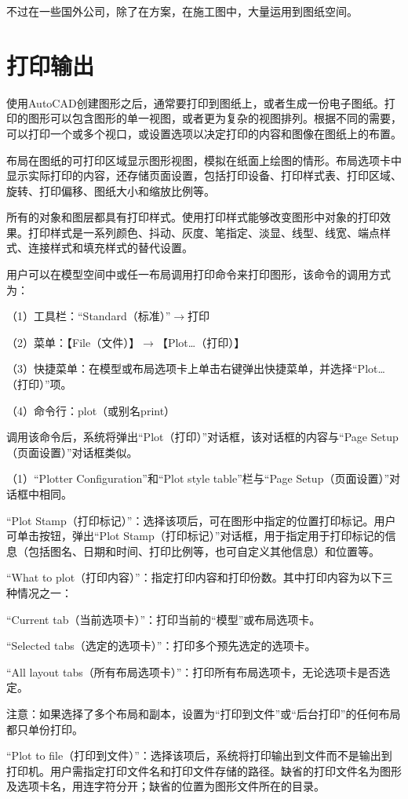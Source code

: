 不过在一些国外公司，除了在方案，在施工图中，大量运用到图纸空间。


\chapter{打印输出}


使用AutoCAD创建图形之后，通常要打印到图纸上，或者生成一份电子图纸。打印的图形可以包含图形的单一视图，或者更为复杂的视图排列。根据不同的需要，可以打印一个或多个视口，或设置选项以决定打印的内容和图像在图纸上的布置。

布局在图纸的可打印区域显示图形视图，模拟在纸面上绘图的情形。布局选项卡中显示实际打印的内容，还存储页面设置，包括打印设备、打印样式表、打印区域、旋转、打印偏移、图纸大小和缩放比例等。

所有的对象和图层都具有打印样式。使用打印样式能够改变图形中对象的打印效果。打印样式是一系列颜色、抖动、灰度、笔指定、淡显、线型、线宽、端点样式、连接样式和填充样式的替代设置。

用户可以在模型空间中或任一布局调用打印命令来打印图形，该命令的调用方式为：

（1）工具栏：“Standard（标准）”$\to$打印

（2）菜单：【File（文件）】$\to$【Plot…（打印）】

（3）快捷菜单：在模型或布局选项卡上单击右键弹出快捷菜单，并选择“Plot…（打印）”项。

（4）命令行：plot（或别名print）

调用该命令后，系统将弹出“Plot（打印）”对话框，该对话框的内容与“Page Setup（页面设置）”对话框类似。

（1）“Plotter Configuration”和“Plot style table”栏与“Page Setup（页面设置）”对话框中相同。

\begin{compactitem}
\item “Plot Stamp（打印标记）”：选择该项后，可在图形中指定的位置打印标记。用户可单击按钮，弹出“Plot Stamp（打印标记）”对话框，用于指定用于打印标记的信息（包括图名、日期和时间、打印比例等，也可自定义其他信息）和位置等。

\item “What to plot（打印内容）”：指定打印内容和打印份数。其中打印内容为以下三种情况之一：

\begin{compactenum}
\item “Current tab（当前选项卡）”：打印当前的“模型”或布局选项卡。
\item “Selected tabs（选定的选项卡）”：打印多个预先选定的选项卡。
\item “All layout tabs（所有布局选项卡）”：打印所有布局选项卡，无论选项卡是否选定。
\end{compactenum}

注意：如果选择了多个布局和副本，设置为“打印到文件”或“后台打印”的任何布局都只单份打印。

\item “Plot to file（打印到文件）”：选择该项后，系统将打印输出到文件而不是输出到打印机。用户需指定打印文件名和打印文件存储的路径。缺省的打印文件名为图形及选项卡名，用连字符分开；缺省的位置为图形文件所在的目录。
\end{compactitem}

